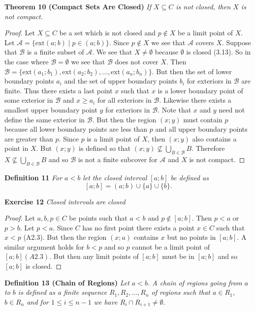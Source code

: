 \documentclass{article}
\begin{document}
\begin{flushleft}
\textbf{Theorem 10 (Compact Sets Are Closed)}
\textsl{If $X \subseteq C$ is not closed, then $X$ is not compact.}
\begin{proof}
Let $X \subseteq C$ be a set which is not closed and $p \notin X$ be a limit point of $X$. Let $\mathcal{A} = \{\text{ext}(a;b) \mid p \in (a;b)\}$. Since $p \notin X$ we see that $\mathcal{A}$ covers $X$. Suppose that $\mathcal{B}$ is a finite subset of $\mathcal{A}$. We see that $X \neq \emptyset$ because $\emptyset$ is closed (3.13). So in the case where $\mathcal{B}=\emptyset$ we see that $\mathcal{B}$ does not cover $X$. Then $\mathcal{B} = \{\text{ext}(a_1;b_1), \text{ext}(a_2;b_2), \dots ,\text{ext}(a_n;b_n)\}$. But then the set of lower boundary points $a_i$ and the set of upper boundary points $b_i$ for exteriors in $\mathcal{B}$ are finite. Thus there exists a last point $x$ such that $x$ is a lower boundary point of some exterior in $\mathcal{B}$ and $x \geq a_i$ for all exteriors in $\mathcal{B}$. Likewise there exists a smallest upper boundary point $y$ for exteriors in $\mathcal{B}$. Note that $x$ and $y$ need not define the same exterior in $\mathcal{B}$. But then the region $(x;y)$ must contain $p$ because all lower boundary points are less than $p$ and all upper boundary points are greater than $p$. Since $p$ is a limit point of $X$, then $(x;y)$ also contains a point in $X$. But $(x;y)$ is defined so that $(x;y) \nsubseteq \bigcup_{B \in \mathcal{B}} B$. Therefore $X \nsubseteq \bigcup_{B \in \mathcal{B}} B$ and so $\mathcal{B}$ is not a finite subcover for $\mathcal{A}$ and $X$ is not compact.
\end{proof}

\textbf{Definition 11}
\textsl{For $a<b$ let the closed interval $[a;b]$ be defined as
\[
[a;b] = (a;b) \cup \{a\} \cup \{b\}.
\]}\newline

\textbf{Exercise 12}
\textsl{Closed intervals are closed}
\begin{proof}
Let $a,b,p \in C$ be points such that $a<b$ and $p \notin [a;b]$. Then $p<a$ or $p>b$. Let $p<a$. Since $C$ has no first point there exists a point $x \in C$ such that $x<p$ (A2.3). But then the region $(x;a)$ contains $x$ but no points in $[a;b]$. A similar argument holds for $b<p$ and so $p$ cannot be a limit point of $[a;b] (A2.3)$. But then any limit points of $[a;b]$ must be in $[a;b]$ and so $[a;b]$ is closed.
\end{proof}

\textbf{Definition 13 (Chain of Regions)}
\textsl{Let $a<b$. A chain of regions going from $a$ to $b$ is defined as a finite sequence $R_1, R_2, \dots ,R_n$ of regions such that $a \in R_1$, $b \in R_n$ and for $1 \leq i \leq n-1$ we have $R_i \cap R_{i+1} \neq \emptyset$.}\newline


\end{flushleft}
\end{document}
